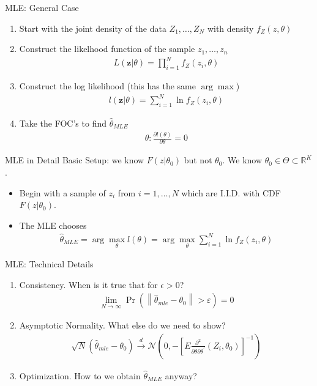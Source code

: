 \documentclass[aspectratio=169]{beamer}
\begin{document}
\begin{frame}{MLE: General Case}
\begin{enumerate}
\item Start with the \alert{joint density of the data} $Z_1,\ldots,Z_N$ with density $f_Z(z,\theta)$
\item Construct the likelhood function of the sample $z_1,\ldots,z_n$
\begin{align*}
L(\mathbf{z} | \theta) = \prod_{i=1}^N f_Z(z_i,\theta)
\end{align*}
\item Construct the \alert{log likelihood} (this has the same $\arg \max$)
\begin{align*}
l(\mathbf{z} | \theta) = \sum_{i=1}^N \ln f_Z(z_i,\theta)
\end{align*}
\item Take the FOC's to find $\widehat{\theta}_{MLE}$
\begin{align*}
\theta : \frac{\partial l(\theta)}{\partial \theta} =0
\end{align*}
\end{enumerate}
\end{frame}

\begin{frame}{MLE in Detail}
Basic Setup: we know $F(z|\theta_0)$ but not $\theta_0$. We know $\theta_0 \in \Theta \subset \mathbb{R}^K$.
\begin{itemize}
\item Begin with a sample of $z_i$ from $i=1,\ldots,N$ which are I.I.D. with CDF $F(z|\theta_0)$.
\item The MLE chooses
\begin{align*}
\widehat{\theta}_{MLE} = \arg \max_{\theta} l(\theta) = \arg \max_{\theta} \sum_{i=1}^N \ln f_Z(z_i,\theta)
\end{align*}
\end{itemize}
\end{frame}


\begin{frame}{MLE: Technical Details}
\begin{enumerate}
\item Consistency. When is it true that for $\epsilon>0$?
\begin{align*}
\lim _ { N \rightarrow \infty } \operatorname { Pr } \left( \left\| \hat { \theta } _ { m l e } - \theta _ { 0 } \right\| > \varepsilon \right) = 0
\end{align*}
\item Asymptotic Normality. What else do we need to show?
\begin{align*}
\sqrt { N } \left( \hat { \theta } _ { m l e } - \theta _ { 0 } \right) \stackrel { d } { \longrightarrow } \mathcal { N } \left( 0 , - \left[ E \frac { \partial ^ { 2 } } { \partial \theta \partial \theta ^ { \prime } } \left( Z _ { i } , \theta _ { 0 } \right) \right] ^ { - 1 } \right)
\end{align*}
\item Optimization. How to we obtain $\widehat{\theta}_{MLE}$ anyway?
\end{enumerate}
\end{frame}
\end{document}

